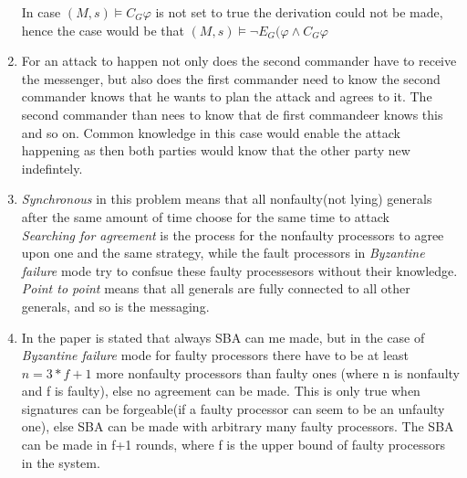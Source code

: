\documentclass[12pt]{article} %
\begin{document}
\begin{enumerate}
        In case $(M,s) \models C_G\varphi$ is not set to true the derivation
        could not be made, hence the case would be that $(M,s) \models
        \lnot E_G(\varphi \wedge C_G\varphi$
    \item
        For an attack to happen not only does the second commander have to receive the
        messenger, but also does the first commander need to know the second
        commander knows that he wants to plan the attack and agrees to it. The
        second commander than nees to know that de first commandeer knows this
        and so on. Common knowledge in this case would enable the attack
        happening as then both parties would know that the other party new
        indefintely.
    \item \emph{Synchronous} in this problem means that all nonfaulty(not
        lying) generals after the same amount of time choose for the same time
        to attack\\
        \emph{Searching for agreement} is the process for the nonfaulty
        processors to agree upon one and the same strategy, while the fault
        processors in \emph{Byzantine failure} mode try to confsue these faulty
        processesors without their knowledge.\\
        \emph{Point to point} means that all generals are fully connected to all
        other generals, and so is the messaging.
    \item In the paper is stated that always SBA can me made, but in the case of \emph{Byzantine failure}
        mode for faulty processors there have to be at least $n = 3*f + 1$ more
        nonfaulty processors than faulty ones (where n is nonfaulty and f is
        faulty), else no agreement can be made. This is only true when
        signatures can be forgeable(if a faulty processor can seem to be an
        unfaulty one), else SBA can be made with arbitrary many
        faulty processors. The SBA can be made in f+1 rounds, where f is the
        upper bound of faulty processors in the system.
         
        

\end{enumerate}
\end{document}

